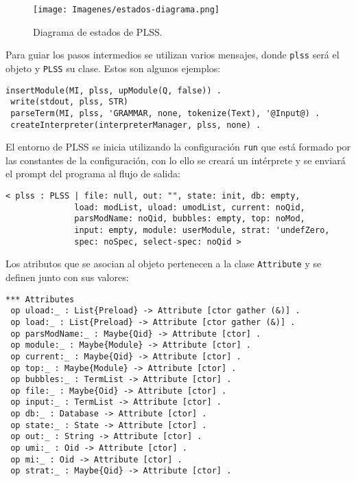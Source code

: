 \begin{figure}[h!]
	\centering
	\texttt{[image: Imagenes/estados-diagrama.png]}
	\caption[Diagrama de estados de PLSS]{Diagrama de estados de PLSS.}
	\label{fig:estados}
\end{figure}

Para guiar los pasos intermedios se utilizan varios mensajes,
donde \texttt{plss} será el objeto y \texttt{PLSS} su clase.
Estos son algunos ejemplos:
\begin{lstlisting}[language=Maude]
 insertModule(MI, plss, upModule(Q, false)) .
 write(stdout, plss, STR)
 parseTerm(MI, plss, 'GRAMMAR, none, tokenize(Text), '@Input@) .
 createInterpreter(interpreterManager, plss, none) .
\end{lstlisting}
\bigskip


El entorno de PLSS se inicia utilizando la configuración \texttt{run} que está formado por las constantes de la configuración, con lo ello se creará un intérprete y se enviará el prompt del programa al flujo de salida:
\begin{lstlisting}[language=Maude]
< plss : PLSS | file: null, out: "", state: init, db: empty,
              load: modList, uload: umodList, current: noQid,
              parsModName: noQid, bubbles: empty, top: noMod,
              input: empty, module: userModule, strat: 'undefZero,
              spec: noSpec, select-spec: noQid >
\end{lstlisting}
\smallskip

Los atributos que se asocian al objeto pertenecen a la clase \texttt{Attribute} y se definen junto con sus valores:
\begin{lstlisting}[language=Maude]
 *** Attributes
 op uload:_ : List{Preload} -> Attribute [ctor gather (&)] .
 op load:_ : List{Preload} -> Attribute [ctor gather (&)] .
 op parsModName:_ : Maybe{Qid} -> Attribute [ctor] .
 op module:_ : Maybe{Module} -> Attribute [ctor] .
 op current:_ : Maybe{Qid} -> Attribute [ctor] .
 op top:_ : Maybe{Module} -> Attribute [ctor] .
 op bubbles:_ : TermList -> Attribute [ctor] .
 op file:_ : Maybe{Oid} -> Attribute [ctor] .
 op input:_ : TermList -> Attribute [ctor] .
 op db:_ : Database -> Attribute [ctor] .
 op state:_ : State -> Attribute [ctor] .
 op out:_ : String -> Attribute [ctor] .
 op umi:_ : Oid -> Attribute [ctor] .
 op mi:_ : Oid -> Attribute [ctor] .
 op strat:_ : Maybe{Qid} -> Attribute [ctor] .
\end{lstlisting}
\medskip

